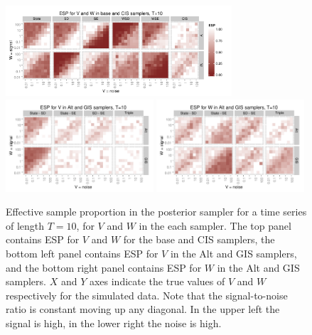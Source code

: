 \documentclass{article}
\begin{document}
\begin{figure}[!h]
\centering
\includegraphics[width=0.75\textwidth]{basecisESplot10}
\includegraphics[width=0.49\textwidth]{altintESplotV10}
\includegraphics[width=0.49\textwidth]{altintESplotW10}
\caption{Effective sample proportion in the posterior sampler for a time series of length $T=10$, for $V$ and $W$ in the each sampler. The top panel contains ESP for $V$ and $W$ for the base and CIS samplers, the bottom left panel contains ESP for $V$ in the Alt and GIS samplers, and the bottom right panel contains ESP for $W$ in the Alt and GIS samplers. $X$ and $Y$ axes indicate the true values of $V$ and $W$ respectively for the simulated data. Note that the signal-to-noise ratio is constant moving up any diagonal. In the upper left the signal is high, in the lower right the noise is high.}
\label{ESplot1}
\end{figure}
\end{document}
